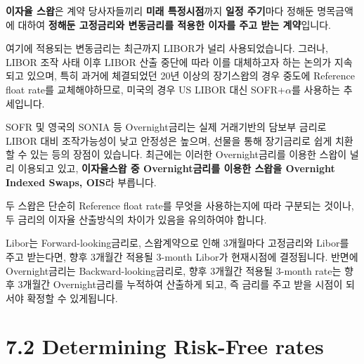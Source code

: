 \documentclass[
  letterpaper,
  DIV=11,
  numbers=noendperiod]{scrreprt}
\begin{document}

\textbf{이자율 스왑}은 계약 당사자들끼리 \textbf{미래 특정시점}까지
\textbf{일정 주기}마다 정해둔 명목금액에 대하여 \textbf{정해둔
고정금리와 변동금리를 적용한 이자를 주고 받는 계약}입니다.

여기에 적용되는 변동금리는 최근까지 LIBOR가 널리 사용되었습니다. 그러나,
LIBOR 조작 사태 이후 LIBOR 산출 중단에 따라 이를 대체하고자 하는 논의가
지속되고 있으며, 특히 과거에 체결되었던 20년 이상의 장기스왑의 경우
중도에 Reference float rate를 교체해야하므로, 미국의 경우 US LIBOR 대신
SOFR+\(\alpha\)를 사용하는 추세입니다.

SOFR 및 영국의 SONIA 등 Overnight금리는 실제 거래기반의 담보부 금리로
LIBOR 대비 조작가능성이 낮고 안정성은 높으며, 선물을 통해 장기금리로
쉽게 치환할 수 있는 등의 장점이 있습니다. 최근에는 이러한
Overnight금리를 이용한 스왑이 널리 이용되고 있고, \textbf{이자율스왑 중
Overnight금리를 이용한 스왑을 Overnight Indexed Swaps, OIS}라 부릅니다.

\begin{tcolorbox}[enhanced jigsaw, toprule=.15mm, breakable, left=2mm, leftrule=.75mm, opacitybacktitle=0.6, coltitle=black, rightrule=.15mm, colback=white, titlerule=0mm, bottomtitle=1mm, colframe=quarto-callout-note-color-frame, title=\textcolor{quarto-callout-note-color}{\faInfo}\hspace{0.5em}{LIBOR swaps vs.~OISs}, toptitle=1mm, arc=.35mm, colbacktitle=quarto-callout-note-color!10!white, opacityback=0, bottomrule=.15mm]

두 스왑은 단순히 Reference float rate를 무엇을 사용하는지에 따라
구분되는 것이나, 두 금리의 이자율 산출방식의 차이가 있음을 유의하여야
합니다.

Libor는 Forward-looking금리로, 스왑계약으로 인해 3개월마다 고정금리와
Libor를 주고 받는다면, 향후 3개월간 적용될 3-month Libor가 현재시점에
결정됩니다. 반면에 Overnight금리는 Backward-looking금리로, 향후 3개월간
적용될 3-month rate는 향후 3개월간 Overnight금리를 누적하여 산출하게
되고, 즉 금리를 주고 받을 시점이 되서야 확정할 수 있게됩니다.

\end{tcolorbox}

\section*{7.2 Determining Risk-Free
rates}\label{determining-risk-free-rates}
\end{document}
